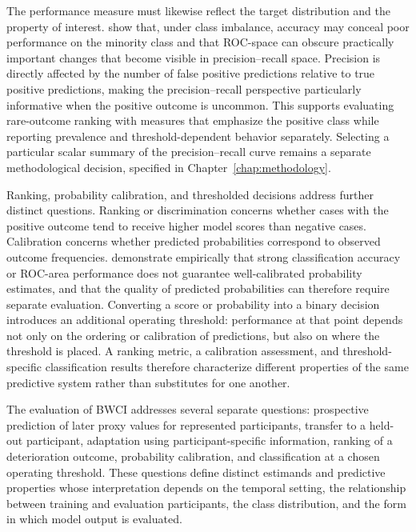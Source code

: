 The performance measure must likewise reflect the target distribution and the property of interest. \textcite{saito2015precisionRecall} show that, under class imbalance, accuracy may conceal poor performance on the minority class and that ROC-space can obscure practically important changes that become visible in precision--recall space. Precision is directly affected by the number of false positive predictions relative to true positive predictions, making the precision--recall perspective particularly informative when the positive outcome is uncommon. This supports evaluating rare-outcome ranking with measures that emphasize the positive class while reporting prevalence and threshold-dependent behavior separately. Selecting a particular scalar summary of the precision--recall curve remains a separate methodological decision, specified in Chapter~\ref{chap:methodology}.

Ranking, probability calibration, and thresholded decisions address further distinct questions. Ranking or discrimination concerns whether cases with the positive outcome tend to receive higher model scores than negative cases. Calibration concerns whether predicted probabilities correspond to observed outcome frequencies. \textcite{niculescu2005goodProbabilities} demonstrate empirically that strong classification accuracy or ROC-area performance does not guarantee well-calibrated probability estimates, and that the quality of predicted probabilities can therefore require separate evaluation. Converting a score or probability into a binary decision introduces an additional operating threshold: performance at that point depends not only on the ordering or calibration of predictions, but also on where the threshold is placed. A ranking metric, a calibration assessment, and threshold-specific classification results therefore characterize different properties of the same predictive system rather than substitutes for one another.

The evaluation of BWCI addresses several separate questions: prospective prediction of later proxy values for represented participants, transfer to a held-out participant, adaptation using participant-specific information, ranking of a deterioration outcome, probability calibration, and classification at a chosen operating threshold. These questions define distinct estimands and predictive properties whose interpretation depends on the temporal setting, the relationship between training and evaluation participants, the class distribution, and the form in which model output is evaluated.

